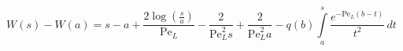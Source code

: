 $$
W(s) - W(a) = s - a + \frac{2 \log{\left(\frac{s}{a} \right)}}{\mathrm{Pe}_L} - \frac{2}{\mathrm{Pe}_L^{2} s} + \frac{2}{\mathrm{Pe}_L^{2} a} - q(b) \int\limits_{a}^{s} \frac{e^{- \mathrm{Pe}_L \left(b - t\right)}}{t^{2}}\, dt
$$
